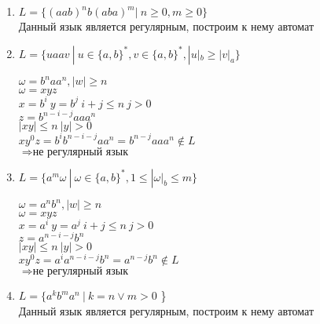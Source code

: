 \documentclass{article}
\begin{document}
        \begin{enumerate}
            \LARGE
        
            \item $L = \{ (aab)^n b(aba)^m | \ n \geq 0, m \geq 0 \}$ \\
                Данный язык является регулярным, построим к нему автомат
                \begin{center}
                \end{center}
            
            \item $ L = \{ uaav \ | \  u \in \{a,b\}^*, v \in \{a,b\}^*, |u|_b \geq |v|_a \}$ 
                \begin{center}
                    $\omega = b^naa^n, |w| \geq n$ \\
                    $\omega = xyz$ \\
                    $x =b^i \ y = b^j \ i+j \leq n \ j > 0$ \\
                    $z = b^{n-i-j}aaa^n$ \\
                    $|xy| \leq n \ |y| > 0$ \\
                    $xy^0z = b^ib^{n-i-j}aa^n = b^{n-j}aaa^n \notin L$ \\
                    $\Rightarrow \textbf{не регулярный язык}$
                \end{center}
            
            \item $L = \{ a^m \omega \ | \ \omega \in \{a,b\}^*, 1 \leq |\omega|_b \leq m \}$ \\
                \begin{center}
                    $\omega = a^nb^n, |w| \geq n$ \\
                    $\omega = xyz$ \\
                    $x = a^i \  y = a^j \  i + j \leq n \  j > 0$ \\
                    $z = a^{n-i-j}b^n$ \\
                    $|xy| \leq n \  |y| > 0$ \\
                    $xy^0z = a^i a^{n-i-j} b^n = a^{n-j} b^n \notin L$ \\
                    $\Rightarrow \textbf{не регулярный язык}$
                \end{center}
        
            \item $L = \{ a^k b^m a^n \ | \ k = n \vee m > 0$ \} \\
                Данный язык является регулярным, построим к нему автомат
                \begin{center}
                \end{center}
                

\end{enumerate}
\end{document}
